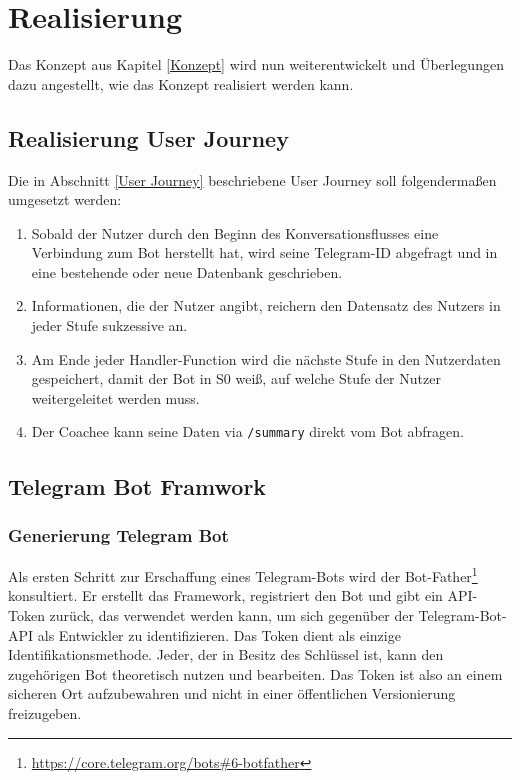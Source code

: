 \label{Realisierung}
\chapter{Realisierung}

    Das Konzept aus Kapitel \ref*{Konzept} wird nun weiterentwickelt und Überlegungen dazu angestellt, wie das Konzept realisiert werden kann.

    \section{Realisierung User Journey}

    Die in Abschnitt \ref{User Journey} beschriebene User Journey soll folgendermaßen umgesetzt werden:

    \begin{enumerate}
        \item Sobald der Nutzer durch den Beginn des Konversationsflusses eine Verbindung zum Bot herstellt hat, wird seine Telegram-ID abgefragt und in eine bestehende oder neue Datenbank geschrieben.
        \item Informationen, die der Nutzer angibt, reichern den Datensatz des Nutzers in jeder Stufe sukzessive an.
        \item Am Ende jeder Handler-Function wird die nächste Stufe in den Nutzerdaten gespeichert, damit der Bot in S0 weiß, auf welche Stufe der Nutzer weitergeleitet werden muss.
        \item Der Coachee kann seine Daten via \verb|/summary| direkt vom Bot abfragen.


    \end{enumerate}

    \section{Telegram Bot Framwork}

        \subsection{Generierung Telegram Bot} \label{botfather}
            Als ersten Schritt zur Erschaffung eines Telegram-Bots wird der Bot-Father\footnote{\url{https://core.telegram.org/bots\#6-botfather}} konsultiert.  Er erstellt das Framework, registriert den Bot und gibt ein API-Token zurück, das verwendet werden kann, um sich gegenüber der Telegram-Bot-API als Entwickler zu identifizieren. \cite{telegramAPI} Das Token dient als einzige Identifikationsmethode. Jeder, der in Besitz des Schlüssel ist, kann den zugehörigen Bot theoretisch nutzen und bearbeiten. Das Token ist also an einem sicheren Ort aufzubewahren und nicht in einer öffentlichen Versionierung freizugeben.

